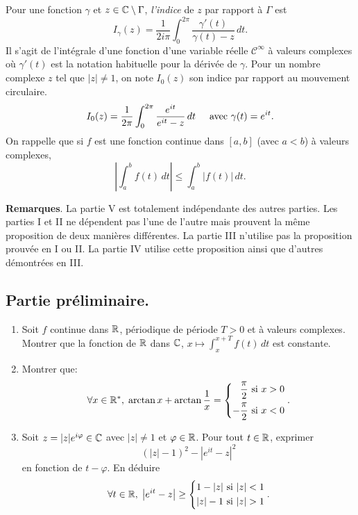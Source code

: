 Pour une fonction $\gamma$ et $z\in \mathbb{C} \setminus \Gamma$, \emph{l'indice} de $z$ par rapport à $\Gamma$ est 
\[
 I_\gamma (z) = \frac{1}{2 i \pi}\int_{0}^{2\pi}\frac{\gamma'(t)}{\gamma(t) - z} \, dt.
\]
Il s'agit de l'intégrale d'une fonction d'une variable réelle $\mathcal{C}^{\infty}$ à valeurs complexes où $\gamma'(t)$ est la notation habituelle pour la dérivée de $\gamma$. Pour un nombre complexe $z$ tel que $|z|\neq 1$, on note $I_0(z)$ son indice par rapport au mouvement circulaire.
\[
 I_0(z) = \frac{1}{2  \pi}\int_{0}^{2\pi}\frac{ e^{it}}{e^{it} - z} \, dt\hspace{0.5cm} \text{avec } \gamma(t) = e^{it}.
\]
On rappelle que si $f$ est une fonction continue dans $[a,b]$ (avec $a < b$) à valeurs complexes,
\[
 \left| \int_a^b f(t)\, dt \right| \leq \int_a^b |f(t)|\, dt.
\]

\textbf{Remarques}. La partie V est totalement indépendante des autres parties. Les parties I et II ne dépendent pas l'une de l'autre mais prouvent la même proposition de deux manières différentes. La partie III n'utilise pas la proposition prouvée en I ou II. La partie IV utilise cette proposition ainsi que d'autres démontrées en III.

\subsection*{Partie préliminaire.}
\begin{enumerate}
 \item Soit $f$ continue dans $\mathbb{R}$, périodique de période $T>0$ et à valeurs complexes.\newline
Montrer que la fonction de $\mathbb{R}$ dans $\mathbb{C}$, $ x \mapsto \int_x^{x+T}f(t)\, dt$ est constante.

 \item Montrer que:
\[
 \forall x \in \mathbb{R}^*, \; \arctan x + \arctan \frac{1}{x} =
 \left\lbrace 
 \begin{aligned}
  \frac{\pi}{2} &\text{ si } x > 0 \\
  -\frac{\pi}{2} &\text{ si } x < 0
 \end{aligned}
 \right. .
\]

 \item Soit $z=|z|e^{i\varphi} \in \mathbb{C}$ avec $|z|\neq 1$ et $\varphi \in \mathbb{R}$. Pour tout $t\in \mathbb{R}$, exprimer 
\[
 (|z|-1)^2 - \left|e^{it} - z\right|^2
\]
en fonction de $t-\varphi$. En déduire
\[
\forall t \in \mathbb{R}, \; \left|e^{it} - z\right| \geq
\left\lbrace 
\begin{aligned}
 1 - |z| &\text{ si } |z| < 1 \\
 |z| - 1 &\text{ si } |z| > 1
\end{aligned}
\right. .
\]

\end{enumerate}

